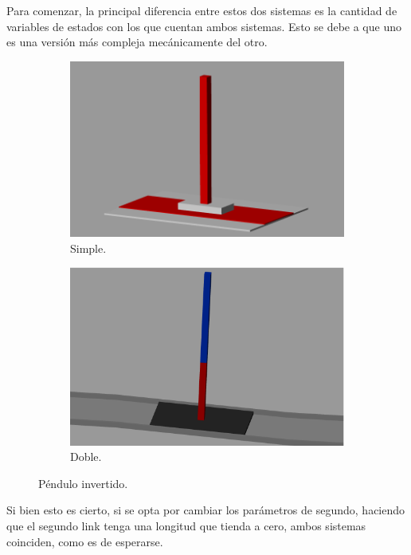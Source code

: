 Para comenzar, la principal diferencia entre estos dos sistemas es la cantidad de variables de estados con los que cuentan ambos sistemas.
Esto se debe a que uno es una versión más compleja mecánicamente del otro.
\begin{figure}[H]
\begin{subfigure}{.5\textwidth}
  \centering
  \includegraphics[width=0.95\linewidth]{../Analisis de Resultados/ImagenesAnalisis de Resultados/equilibrio.png}
  \caption{Simple.}
  \label{fig:sfig1}
\end{subfigure}%
\begin{subfigure}{.5\textwidth}
  \centering
  \includegraphics[width=0.95\linewidth]{../Analisis de Resultados/ImagenesAnalisis de Resultados/simscape_double_pendulum.png}
  \caption{Doble.}
  \label{fig:sfig2}
\end{subfigure}
\caption{Péndulo invertido.}
\label{fig:fig}
\end{figure}
Si bien esto es cierto, si se opta por cambiar los parámetros de segundo, haciendo que el segundo link tenga una longitud que tienda a cero, ambos sistemas coinciden, como es de esperarse.

